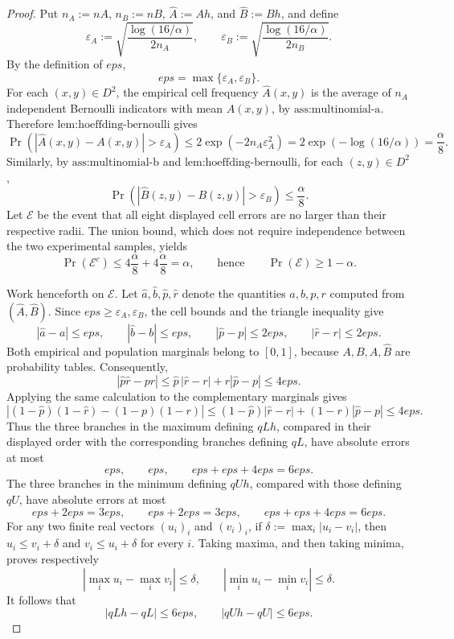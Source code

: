 \documentclass{article}
\begin{document}
\begin{proof}
Put \(n_A:=nA\), \(n_B:=nB\), \(\widehat A:=Ah\), and \(\widehat B:=Bh\), and define
\[
 \varepsilon_A:=\sqrt{\frac{\log(16/\alpha)}{2n_A}},
 \qquad
 \varepsilon_B:=\sqrt{\frac{\log(16/\alpha)}{2n_B}}.
\]
By the definition of \(eps\),
\[
 eps=\max\{\varepsilon_A,\varepsilon_B\}.
\]
For each \((x,y)\in D^2\), the empirical cell frequency \(\widehat A(x,y)\) is the average of \(n_A\) independent Bernoulli indicators with mean \(A(x,y)\), by \(\text{ass:multinomial-a}\).  Therefore \(\text{lem:hoeffding-bernoulli}\) gives
\[
 \Pr\!\left(\left|\widehat A(x,y)-A(x,y)\right|>\varepsilon_A\right)
 \le 2\exp(-2n_A\varepsilon_A^2)
 =2\exp\!\left(-\log(16/\alpha)\right)
 =\frac{\alpha}{8}.
\]
Similarly, by \(\text{ass:multinomial-b}\) and \(\text{lem:hoeffding-bernoulli}\), for each \((z,y)\in D^2\),
\[
 \Pr\!\left(\left|\widehat B(z,y)-B(z,y)\right|>\varepsilon_B\right)
 \le \frac{\alpha}{8}.
\]
Let \(\mathcal E\) be the event that all eight displayed cell errors are no larger than their respective radii.  The union bound, which does not require independence between the two experimental samples, yields
\[
 \Pr(\mathcal E^c)
 \le 4\frac{\alpha}{8}+4\frac{\alpha}{8}
 =\alpha,
 \qquad\text{hence}\qquad
 \Pr(\mathcal E)\ge 1-\alpha.
\]

Work henceforth on \(\mathcal E\).  Let \(\widehat a,\widehat b,\widehat p,\widehat r\) denote the quantities \(a,b,p,r\) computed from \((\widehat A,\widehat B)\).  Since \(eps\ge\varepsilon_A,\varepsilon_B\), the cell bounds and the triangle inequality give
\[
 |\widehat a-a|\le eps,
 \qquad
 |\widehat b-b|\le eps,
 \qquad
 |\widehat p-p|\le 2eps,
 \qquad
 |\widehat r-r|\le 2eps.
\]
Both empirical and population marginals belong to \([0,1]\), because \(A,B,\widehat A,\widehat B\) are probability tables.  Consequently,
\[
 |\widehat p\widehat r-pr|
 \le \widehat p\,|\widehat r-r|+r|\widehat p-p|
 \le 4eps.
\]
Applying the same calculation to the complementary marginals gives
\[
 |(1-\widehat p)(1-\widehat r)-(1-p)(1-r)|
 \le (1-\widehat p)|\widehat r-r|+(1-r)|\widehat p-p|
 \le 4eps.
\]
Thus the three branches in the maximum defining \(qLh\), compared in their displayed order with the corresponding branches defining \(qL\), have absolute errors at most
\[
 eps,\qquad eps,\qquad eps+eps+4eps=6eps.
\]
The three branches in the minimum defining \(qUh\), compared with those defining \(qU\), have absolute errors at most
\[
 eps+2eps=3eps,\qquad eps+2eps=3eps,\qquad eps+eps+4eps=6eps.
\]
For any two finite real vectors \((u_i)_i\) and \((v_i)_i\), if \(\delta:=\max_i|u_i-v_i|\), then \(u_i\le v_i+\delta\) and \(v_i\le u_i+\delta\) for every \(i\).  Taking maxima, and then taking minima, proves respectively
\[
 \left|\max_i u_i-\max_i v_i\right|\le\delta,
 \qquad
 \left|\min_i u_i-\min_i v_i\right|\le\delta.
\]
It follows that
\[
 |qLh-qL|\le 6eps,
 \qquad
 |qUh-qU|\le 6eps.
\]


\end{proof}
\end{document}

